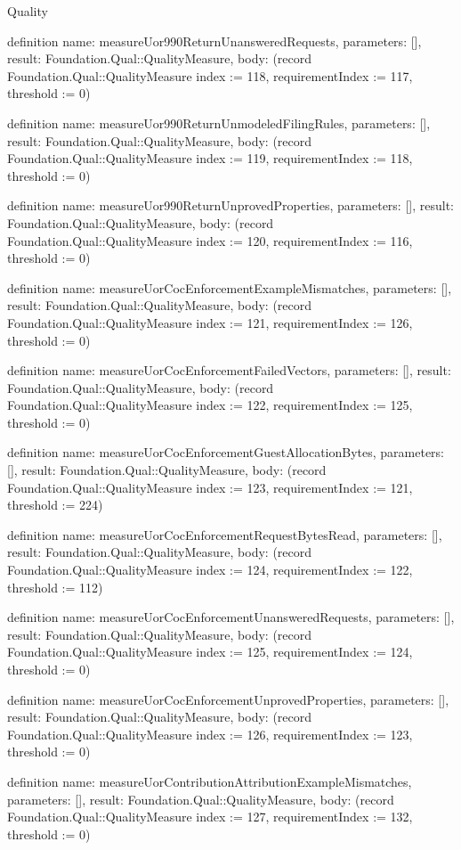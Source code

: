 \begin{lexlean}{Quality}
\begin{semanticmodule}
definition{
  name: measureUor990ReturnUnansweredRequests,
  parameters: [],
  result: Foundation.Qual::QualityMeasure,
  body: (record Foundation.Qual::QualityMeasure {index := 118, requirementIndex := 117, threshold := 0})
}

definition{
  name: measureUor990ReturnUnmodeledFilingRules,
  parameters: [],
  result: Foundation.Qual::QualityMeasure,
  body: (record Foundation.Qual::QualityMeasure {index := 119, requirementIndex := 118, threshold := 0})
}

definition{
  name: measureUor990ReturnUnprovedProperties,
  parameters: [],
  result: Foundation.Qual::QualityMeasure,
  body: (record Foundation.Qual::QualityMeasure {index := 120, requirementIndex := 116, threshold := 0})
}

definition{
  name: measureUorCocEnforcementExampleMismatches,
  parameters: [],
  result: Foundation.Qual::QualityMeasure,
  body: (record Foundation.Qual::QualityMeasure {index := 121, requirementIndex := 126, threshold := 0})
}

definition{
  name: measureUorCocEnforcementFailedVectors,
  parameters: [],
  result: Foundation.Qual::QualityMeasure,
  body: (record Foundation.Qual::QualityMeasure {index := 122, requirementIndex := 125, threshold := 0})
}

definition{
  name: measureUorCocEnforcementGuestAllocationBytes,
  parameters: [],
  result: Foundation.Qual::QualityMeasure,
  body: (record Foundation.Qual::QualityMeasure {index := 123, requirementIndex := 121, threshold := 224})
}

definition{
  name: measureUorCocEnforcementRequestBytesRead,
  parameters: [],
  result: Foundation.Qual::QualityMeasure,
  body: (record Foundation.Qual::QualityMeasure {index := 124, requirementIndex := 122, threshold := 112})
}

definition{
  name: measureUorCocEnforcementUnansweredRequests,
  parameters: [],
  result: Foundation.Qual::QualityMeasure,
  body: (record Foundation.Qual::QualityMeasure {index := 125, requirementIndex := 124, threshold := 0})
}

definition{
  name: measureUorCocEnforcementUnprovedProperties,
  parameters: [],
  result: Foundation.Qual::QualityMeasure,
  body: (record Foundation.Qual::QualityMeasure {index := 126, requirementIndex := 123, threshold := 0})
}

definition{
  name: measureUorContributionAttributionExampleMismatches,
  parameters: [],
  result: Foundation.Qual::QualityMeasure,
  body: (record Foundation.Qual::QualityMeasure {index := 127, requirementIndex := 132, threshold := 0})
}


\end{semanticmodule}
\end{lexlean}
